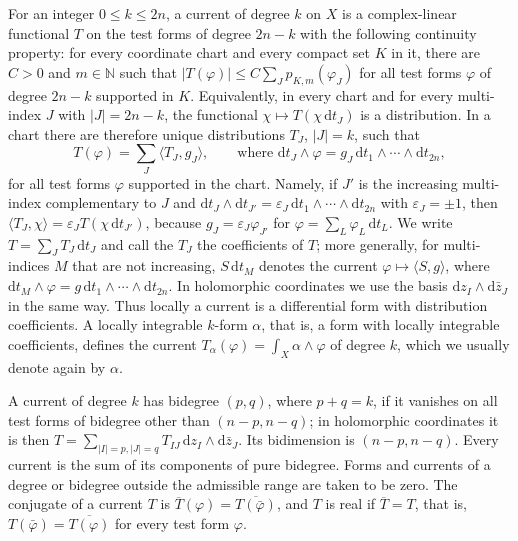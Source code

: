 For an integer $0\leq k\leq2n$, a current of degree $k$ on $X$ is a complex-linear functional $T$ on the test forms of degree $2n-k$ with the following continuity property: for every coordinate chart and every compact set $K$ in it, there are $C>0$ and $m\in\mathbb N$ such that $|T(\varphi)|\leq C\sum_Jp_{K,m}(\varphi_J)$ for all test forms $\varphi$ of degree $2n-k$ supported in $K$. Equivalently, in every chart and for every multi-index $J$ with $|J|=2n-k$, the functional $\chi\mapsto T(\chi\,\mathrm dt_J)$ is a distribution. In a chart there are therefore unique distributions $T_J$, $|J|=k$, such that
\[
 T(\varphi)=\sum_J\langle T_J,g_J\rangle,\qquad\text{where }\mathrm dt_J\wedge\varphi=g_J\,\mathrm dt_1\wedge\cdots\wedge\mathrm dt_{2n},
\]
for all test forms $\varphi$ supported in the chart. Namely, if $J'$ is the increasing multi-index complementary to $J$ and $\mathrm dt_J\wedge\mathrm dt_{J'}=\varepsilon_J\,\mathrm dt_1\wedge\cdots\wedge\mathrm dt_{2n}$ with $\varepsilon_J=\pm1$, then $\langle T_J,\chi\rangle=\varepsilon_JT(\chi\,\mathrm dt_{J'})$, because $g_J=\varepsilon_J\varphi_{J'}$ for $\varphi=\sum_L\varphi_L\,\mathrm dt_L$. We write $T=\sum_JT_J\,\mathrm dt_J$ and call the $T_J$ the coefficients of $T$; more generally, for multi-indices $M$ that are not increasing, $S\,\mathrm dt_M$ denotes the current $\varphi\mapsto\langle S,g\rangle$, where $\mathrm dt_M\wedge\varphi=g\,\mathrm dt_1\wedge\cdots\wedge\mathrm dt_{2n}$. In holomorphic coordinates we use the basis $\mathrm dz_I\wedge\mathrm d\bar z_J$ in the same way. Thus locally a current is a differential form with distribution coefficients. A locally integrable $k$-form $\alpha$, that is, a form with locally integrable coefficients, defines the current $T_\alpha(\varphi)=\int_X\alpha\wedge\varphi$ of degree $k$, which we usually denote again by $\alpha$.

A current of degree $k$ has bidegree $(p,q)$, where $p+q=k$, if it vanishes on all test forms of bidegree other than $(n-p,n-q)$; in holomorphic coordinates it is then $T=\sum_{|I|=p,|J|=q}T_{IJ}\,\mathrm dz_I\wedge\mathrm d\bar z_J$. Its bidimension is $(n-p,n-q)$. Every current is the sum of its components of pure bidegree. Forms and currents of a degree or bidegree outside the admissible range are taken to be zero. The conjugate of a current $T$ is $\overline T(\varphi)=\overline{T(\bar\varphi)}$, and $T$ is real if $\overline T=T$, that is, $T(\bar\varphi)=\overline{T(\varphi)}$ for every test form $\varphi$.

